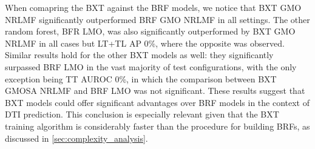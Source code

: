 
When comapring the BXT against the BRF models, we notice that BXT GMO NRLMF significantly outperformed BRF GMO NRLMF in all settings. The other random forest, BFR LMO, was also significantly outperformed by BXT GMO NRLMF in all cases but LT+TL AP 0\%, where the opposite was observed. Similar results hold for the other BXT models as well: they significantly surpassed BRF LMO in the vast majority of test configurations, with the only exception being TT AUROC 0\%, in which the comparison between BXT GMOSA NRLMF and BRF LMO was not significant. These results suggest that BXT models could offer significant advantages over BRF models in the context of DTI prediction. This conclusion is especially relevant given that the BXT training algorithm is considerably faster than the procedure for building BRFs, as discussed in \autoref{sec:complexity_analysis}.



